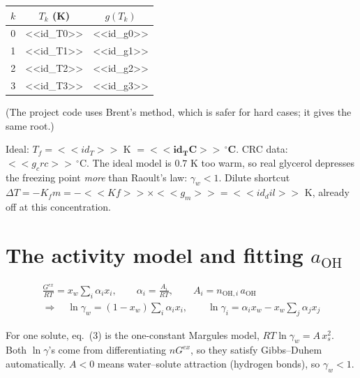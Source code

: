 \documentclass[11pt,a4paper]{article}
\newcommand{\aoh}{a_{\mathrm{OH}}}
\begin{document}
\begin{center}\small
\begin{tabular}{c c c}
\toprule
$k$ & $T_k$ (K) & $g(T_k)$\\
\midrule
0 & <<id_T0>> & <<id_g0>>\\
1 & <<id_T1>> & <<id_g1>>\\
2 & <<id_T2>> & <<id_g2>>\\
3 & <<id_T3>> & <<id_g3>>\\
\bottomrule
\end{tabular}
\end{center}
(The project code uses Brent's method, which is safer for hard cases; it gives the same root.)
\begin{result}
Ideal: $T_f=<<id_T>>$ K $=\mathbf{<<id_TC>>\,^\circ}$\textbf{C}. CRC data: $<<g_crc>>\,^\circ$C. The ideal model is
$0.7$ K too warm, so real glycerol depresses the freezing point \emph{more} than Raoult's law: $\gamma_w<1$.
Dilute shortcut $\Delta T=-K_f m=-<<Kf>>\times<<g_m>>=<<id_dil>>$ K, already off at this concentration.
\end{result}

\section{The activity model and fitting $\aoh$}
\begin{eqbox}
\begin{gather*}
\frac{G^{ex}}{RT}=x_w\sum_i\alpha_i x_i,\qquad \alpha_i=\frac{A_i}{RT},\qquad A_i=n_{\mathrm{OH},i}\,\aoh\\
\Rightarrow\quad \ln\gamma_w=(1-x_w)\sum_i\alpha_i x_i,\qquad \ln\gamma_i=\alpha_i x_w-x_w\sum_j\alpha_jx_j \tag{3}
\end{gather*}
\end{eqbox}
For one solute, eq.~(3) is the one-constant Margules model, $RT\ln\gamma_w=A\,x_s^2$. Both $\ln\gamma$'s come from
differentiating $nG^{ex}$, so they satisfy Gibbs--Duhem automatically. $A<0$ means water--solute attraction (hydrogen bonds), so $\gamma_w<1$.
\end{document}
